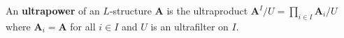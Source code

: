 An \textbf{ultrapower} of an $L$-structure $\mathbf{A}$ is the ultraproduct $\mathbf{A}^I / U = \prod_{i \in I} \mathbf{A}_i / U$ where $\mathbf{A}_i = \mathbf{A}$ for all $i \in I$ and $U$ is an ultrafilter on $I$.
